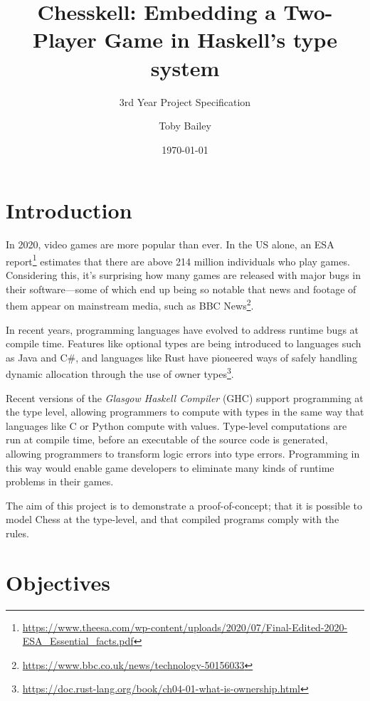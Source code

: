 \documentclass[12pt, a4paper]{scrartcl}
\title{Chesskell: Embedding a Two-Player Game in Haskell's type system}
\subtitle{3rd Year Project Specification}
\author{Toby Bailey}
\date{\today}
\begin{document}
\begin{titlepage}
    \maketitle
    \tableofcontents
\end{titlepage}

\section{Introduction}

In 2020, video games are more popular than ever. In the US alone, an ESA report\footnote{\url{https://www.theesa.com/wp-content/uploads/2020/07/Final-Edited-2020-ESA_Essential_facts.pdf}} estimates that there are above 214 million individuals who play games. Considering this, it's surprising how many games are released with major bugs in their software---some of which end up being so notable that news and footage of them appear on mainstream media, such as BBC News\footnote{\url{https://www.bbc.co.uk/news/technology-50156033}}.

In recent years, programming languages have evolved to address runtime bugs at compile time. Features like optional types are being introduced to languages such as Java and C\#, and languages like Rust have pioneered ways of safely handling dynamic allocation through the use of owner types\footnote{\url{https://doc.rust-lang.org/book/ch04-01-what-is-ownership.html}}.


Recent versions of the \emph{Glasgow Haskell Compiler} (GHC) support programming at the type level, allowing programmers to compute with types in the same way that languages like C or Python compute with values\cite{yorgey2012giving}. Type-level computations are run at compile time, before an executable of the source code is generated, allowing programmers to transform logic errors into type errors\cite{twt}. Programming in this way would enable game developers to eliminate many kinds of runtime problems in their games.

The aim of this project is to demonstrate a proof-of-concept; that it is possible to model Chess at the type-level, and that compiled programs comply with the rules.

\section{Objectives}
\end{document}
